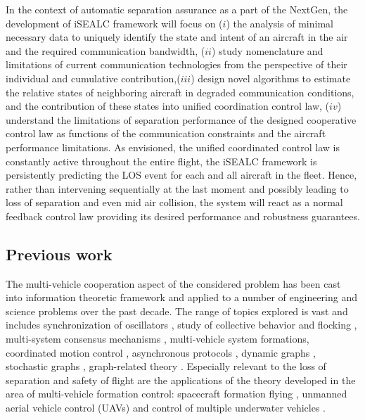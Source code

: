 \documentclass[letter,onecolumn,12pt]{aiaa-tc}
\newcommand{\1}{1_n}
\begin{document}
In the context of automatic separation assurance as a part of the NextGen, the development of iSEALC framework will focus on ($i$) the analysis of  minimal necessary data to uniquely identify the state and intent of an aircraft in the air and the required communication bandwidth, ($ii$) study nomenclature and limitations of current communication technologies from the perspective of their individual and cumulative contribution,($iii$) design novel algorithms to estimate the relative states of  neighboring aircraft in degraded communication conditions, and the contribution of these states into unified coordination control law, ($iv$) understand the limitations of separation performance of the designed cooperative control law as functions of the communication constraints and the aircraft performance limitations. As envisioned, the unified coordinated control law is constantly active throughout the entire flight, the iSEALC framework is persistently predicting the LOS event for each and all aircraft in the fleet. Hence, rather than intervening sequentially at the last moment and possibly leading to loss of separation and even mid air collision, the system will react as a normal feedback control law providing its desired performance and robustness guarantees.

\subsection{Previous work}
\label{subsec:envisioned_solution}
The multi-vehicle cooperation aspect of the considered problem has been cast into information theoretic framework and applied to a number of engineering and science problems over the past decade. The range of topics explored is vast and includes synchronization of oscillators \cite{Sepulchre}, study of collective behavior and flocking
\cite{jadbabaie03}, multi-system consensus mechanisms \cite{lin05}, multi-vehicle system formations\cite{egerstedt01},
coordinated motion control \cite{ghabcheloo06}, asynchronous protocols \cite{Fang}, dynamic graphs \cite{mesbahi},
stochastic graphs \cite{mesbahi, Stilwell, Stilwell2}, graph-related theory \cite{caom, Kim-Meshabi}.
Especially relevant to the loss of separation and safety of flight are the applications of the theory developed in the area of multi-vehicle formation control: spacecraft formation flying \cite{mesbahi-hadaegh}, unmanned aerial vehicle control (UAVs) \cite{Song, Stipanovic}and control of multiple underwater vehicles \cite{pereira}.
\end{document}
